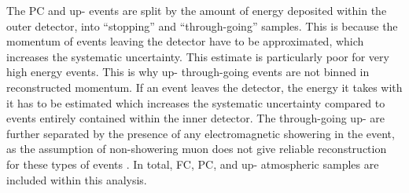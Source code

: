 The PC and up-\quickmath{\mu} events are split by the amount of energy deposited within the outer detector, into ``stopping'' and ``through-going'' samples. This is because the momentum of events leaving the detector have to be approximated, which increases the systematic uncertainty. This estimate is particularly poor for very high energy events. This is why up-\quickmath{\mu} through-going events are not binned in reconstructed momentum. If an event leaves the detector, the energy it takes with it has to be estimated which increases the systematic uncertainty compared to events entirely contained within the inner detector. The through-going up-\quickmath{\mu} are further separated by the presence of any electromagnetic showering in the event, as the assumption of non-showering muon does not give reliable reconstruction for these types of events \cite{Ashie_2005}. In total,  FC,  PC, and  up-\quickmath{\mu} atmospheric samples are included within this analysis.

